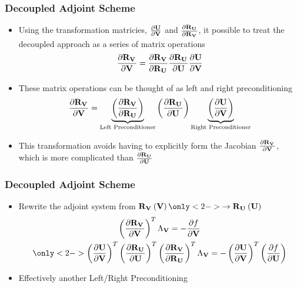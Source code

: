 \documentclass{beamer}
\begin{document}
\begin{frame}
  \frametitle{Decoupled Adjoint Scheme}
  \begin{itemize}
    \item<1-> Using the transformation matricies, $\frac{\partial \mathbf U}{\partial \mathbf V}$ and
      $\frac{\partial \mathbf R_{{\mathbf U}_{}}}{\partial \mathbf R_{{\mathbf V}_{}}}$, it possible to treat the decoupled approach as a
      series of matrix operations
      \begin{equation*}
        \frac{\partial \mathbf R_{{\mathbf V}_{}}}{\partial \mathbf V} = \frac{\partial \mathbf R_{{\mathbf V}_{}}}{\partial \mathbf R_{{\mathbf U}_{}}} \frac{\partial \mathbf R_{{\mathbf U}_{}}}{\partial \mathbf U} \frac{\partial \mathbf U}{\partial \mathbf V}
      \end{equation*}
    \item<2-> These matrix operations can be thought of as left and right
      preconditioning
      \begin{equation*}
        \frac{\partial \mathbf R_{{\mathbf V}_{}}}{\partial \mathbf V} = 
        \underbrace{ \left(\frac{\partial \mathbf R_{{\mathbf V}_{}}}{\partial \mathbf R_{{\mathbf U}_{}}}\right) }_{\text{Left Preconditioner}}
        \left(\frac{\partial \mathbf R_{{\mathbf U}_{}}}{\partial \mathbf U}\right)
        \underbrace{ \left(\frac{\partial \mathbf U}{\partial \mathbf V}\right) }_{\text{Right Preconditioner}}
      \end{equation*}
    \item<3-> This transformation avoids having to explicitly form the Jacobian
      $\frac{\partial \mathbf R_{{\mathbf V}_{}}}{\partial \mathbf V}$, which is more complicated than $\frac{\partial \mathbf R_{{\mathbf U}_{}}}{\partial \mathbf U}$
  \end{itemize}
\end{frame}
\begin{frame}
  \frametitle{Decoupled Adjoint Scheme}
  \begin{itemize}
    \item Rewrite the adjoint system from 
      $\rv{}\left( \mv \right) \only<2->{\rightarrow \ru{}\left( \mU \right)}$
      \begin{gather*}
        \left( \pd{\rv{}}{\mv} \right)^T \adjlam{\mv} = -\pd{f}{\mv} \\
        \only<2->{
          \left( \pd{\mU}{\mv} \right)^T 
          \left( \pd{\ru{}}{\mU} \right)^T 
          \left( \pd{\rv{}}{\ru{}} \right)^T 
          \adjlam{\mv} = -\left( \pd{\mU}{\mv} \right)^T
          \left(\pd{f}{\mU}\right)
        }
      \end{gather*}
    \item<3-> Effectively another Left/Right Preconditioning
  \end{itemize}
  \vspace{0.2cm}
\end{frame}
\end{document}
